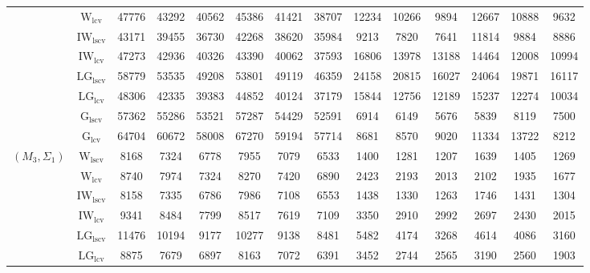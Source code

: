 \begin{table}[!ht]
{\begin{tabular}{@{}cc|ccc|ccc|ccc|ccc@{}}
 & $\mathrm{W}_{\mathrm{lcv}}$ & 47776 & 43292 & 40562 & 45386 & 41421 & 38707 & 12234 & 10266 & 9894 & 12667 & 10888 & 9632 \\ 
 & $\mathrm{IW}_{\mathrm{lscv}}$ & \cellcolor{black!30}43171 & \cellcolor{black!30}39455 & \cellcolor{black!30}36730 & \cellcolor{black!30}42268 & \cellcolor{black!30}38620 & \cellcolor{black!30}35984 & 9213 & 7820 & 7641 & 11814 & 9884 & 8886 \\ 
 & $\mathrm{IW}_{\mathrm{lcv}}$ & 47273 & 42936 & 40326 & \cellcolor{black!10}43390 & \cellcolor{black!10}40062 & 37593 & 16806 & 13978 & 13188 & 14464 & 12008 & 10994 \\ 
 & $\mathrm{LG}_{\mathrm{lscv}}$ & 58779 & 53535 & 49208 & 53801 & 49119 & 46359 & 24158 & 20815 & 16027 & 24064 & 19871 & 16117 \\ 
 & $\mathrm{LG}_{\mathrm{lcv}}$ & 48306 & 42335 & 39383 & 44852 & 40124 & \cellcolor{black!10}37179 & 15844 & 12756 & 12189 & 15237 & 12274 & 10034 \\ 
 & $\mathrm{G}_{\mathrm{lscv}}$ & 57362 & 55286 & 53521 & 57287 & 54429 & 52591 & \cellcolor{black!30}6914 & \cellcolor{black!30}6149 & \cellcolor{black!30}5676 & \cellcolor{black!30}5839 & \cellcolor{black!30}8119 & \cellcolor{black!30}7500 \\ 
 & $\mathrm{G}_{\mathrm{lcv}}$ & 64704 & 60672 & 58008 & 67270 & 59194 & 57714 & 8681 & 8570 & 9020 & 11334 & 13722 & 8212 \\ 
\midrule
$(M_3,\Sigma_1)$ & $\mathrm{W}_{\mathrm{lscv}}$ & \cellcolor{black!10}8168 & \cellcolor{black!30}7324 & \cellcolor{black!30}6778 & \cellcolor{black!30}7955 & \cellcolor{black!10}7079 & \cellcolor{black!10}6533 & 1400 & 1281 & 1207 & 1639 & 1405 & 1269 \\ 
 & $\mathrm{W}_{\mathrm{lcv}}$ & 8740 & 7974 & 7324 & 8270 & 7420 & 6890 & 2423 & 2193 & 2013 & 2102 & 1935 & 1677 \\ 
 & $\mathrm{IW}_{\mathrm{lscv}}$ & \cellcolor{black!30}8158 & \cellcolor{black!10}7335 & \cellcolor{black!10}6786 & \cellcolor{black!10}7986 & 7108 & 6553 & 1438 & 1330 & 1263 & 1746 & 1431 & 1304 \\ 
 & $\mathrm{IW}_{\mathrm{lcv}}$ & 9341 & 8484 & 7799 & 8517 & 7619 & 7109 & 3350 & 2910 & 2992 & 2697 & 2430 & 2015 \\ 
 & $\mathrm{LG}_{\mathrm{lscv}}$ & 11476 & 10194 & 9177 & 10277 & 9138 & 8481 & 5482 & 4174 & 3268 & 4614 & 4086 & 3160 \\ 
 & $\mathrm{LG}_{\mathrm{lcv}}$ & 8875 & 7679 & 6897 & 8163 & \cellcolor{black!30}7072 & \cellcolor{black!30}6391 & 3452 & 2744 & 2565 & 3190 & 2560 & 1903 \\ 

\end{tabular}}
\end{table}
